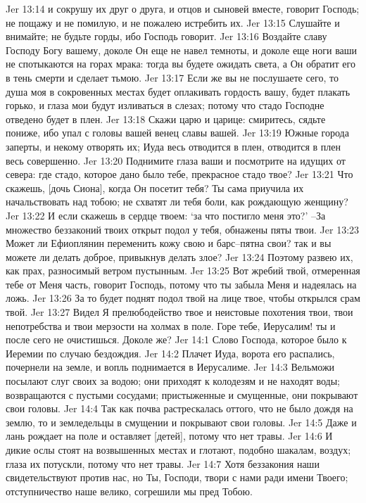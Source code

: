 Jer 13:14  и сокрушу их друг о друга, и отцов и сыновей вместе, говорит Господь; не пощажу и не помилую, и не пожалею истребить их.
Jer 13:15  Слушайте и внимайте; не будьте горды, ибо Господь говорит.
Jer 13:16  Воздайте славу Господу Богу вашему, доколе Он еще не навел темноты, и доколе еще ноги ваши не спотыкаются на горах мрака: тогда вы будете ожидать света, а Он обратит его в тень смерти и сделает тьмою.
Jer 13:17  Если же вы не послушаете сего, то душа моя в сокровенных местах будет оплакивать гордость вашу, будет плакать горько, и глаза мои будут изливаться в слезах; потому что стадо Господне отведено будет в плен.
Jer 13:18  Скажи царю и царице: смиритесь, сядьте пониже, ибо упал с головы вашей венец славы вашей.
Jer 13:19  Южные города заперты, и некому отворять их; Иуда весь отводится в плен, отводится в плен весь совершенно.
Jer 13:20  Поднимите глаза ваши и посмотрите на идущих от севера: где стадо, которое дано было тебе, прекрасное стадо твое?
Jer 13:21  Что скажешь, [дочь Сиона], когда Он посетит тебя? Ты сама приучила их начальствовать над тобою; не схватят ли тебя боли, как рождающую женщину?
Jer 13:22  И если скажешь в сердце твоем: `за что постигло меня это?' --За множество беззаконий твоих открыт подол у тебя, обнажены пяты твои.
Jer 13:23  Может ли Ефиоплянин переменить кожу свою и барс--пятна свои? так и вы можете ли делать доброе, привыкнув делать злое?
Jer 13:24  Поэтому развею их, как прах, разносимый ветром пустынным.
Jer 13:25  Вот жребий твой, отмеренная тебе от Меня часть, говорит Господь, потому что ты забыла Меня и надеялась на ложь.
Jer 13:26  За то будет поднят подол твой на лице твое, чтобы открылся срам твой.
Jer 13:27  Видел Я прелюбодейство твое и неистовые похотения твои, твои непотребства и твои мерзости на холмах в поле. Горе тебе, Иерусалим! ты и после сего не очистишься. Доколе же?
Jer 14:1  Слово Господа, которое было к Иеремии по случаю бездождия.
Jer 14:2  Плачет Иуда, ворота его распались, почернели на земле, и вопль поднимается в Иерусалиме.
Jer 14:3  Вельможи посылают слуг своих за водою; они приходят к колодезям и не находят воды; возвращаются с пустыми сосудами; пристыженные и смущенные, они покрывают свои головы.
Jer 14:4  Так как почва растрескалась оттого, что не было дождя на землю, то и земледельцы в смущении и покрывают свои головы.
Jer 14:5  Даже и лань рождает на поле и оставляет [детей], потому что нет травы.
Jer 14:6  И дикие ослы стоят на возвышенных местах и глотают, подобно шакалам, воздух; глаза их потускли, потому что нет травы.
Jer 14:7  Хотя беззакония наши свидетельствуют против нас, но Ты, Господи, твори с нами ради имени Твоего; отступничество наше велико, согрешили мы пред Тобою.
